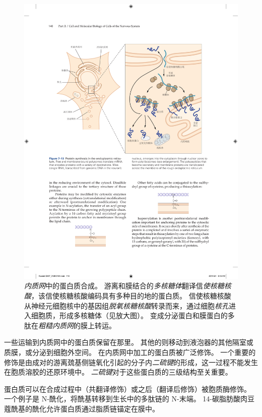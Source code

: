 \begin{figure}[htbp]
	\centering
	\includegraphics[width=1.0\linewidth]{chap07/fig_7_13}
	\caption{\textit{内质网}中的蛋白质合成。
		游离和膜结合的\textit{多核糖体}翻译信\textit{使核糖核酸}，该信使核糖核酸编码具有多种目的地的蛋白质。
		信使核糖核酸从神经元细胞核中的基因组\textit{脱氧核糖核酸}转录而来，通过细胞\textit{核孔}进入细胞质，形成多核糖体（见放大图）。
		变成分泌蛋白和膜蛋白的多肽在\textit{粗糙内质网}的膜上转运。}
	\label{fig:7_13}
\end{figure}


一些运输到内质网中的蛋白质保留在那里。
其他的则移动到液泡器的其他隔室或质膜，或分泌到细胞外空间。
在内质网中加工的蛋白质被广泛修饰。
一个重要的修饰是由成对的游离巯基侧链氧化引起的分子内\textit{二硫键}的形成，这一过程不能发生在胞质溶胶的还原环境中。
\textit{二硫键}对于这些蛋白质的三级结构至关重要。


蛋白质可以在合成过程中（共翻译修饰）或之后（翻译后修饰）被胞质酶修饰。
一个例子是 N-酰化，将酰基转移到生长中的多肽链的 N-末端。
14-碳脂肪酸肉豆蔻酰基的酰化允许蛋白质通过脂质链锚定在膜中。


